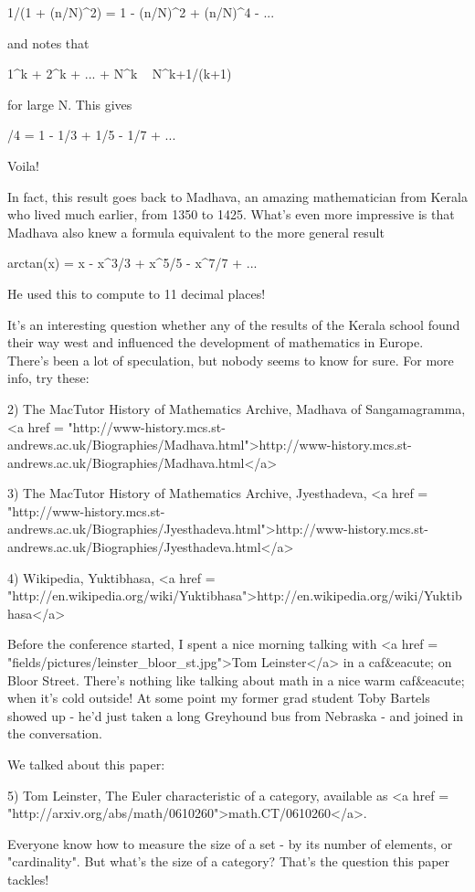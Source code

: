 1/(1 + (n/N)^{2}) = 1 - (n/N)^{2} + (n/N)^{4} - ...

and notes that 

1^{k} + 2^{k} + ... + N^{k} ~ N^{k+1}/(k+1)

for large N.  This gives

\pi /4 = 1 - 1/3 + 1/5 - 1/7 + ...

Voila!

In fact, this result goes back to Madhava, an amazing mathematician 
from Kerala who lived much earlier, from 1350 to 1425.  What's even
more impressive is that Madhava also knew a formula equivalent to the
more general result

arctan(x) = x - x^{3}/3 + x^{5}/5 - x^{7}/7 + ...

He used this to compute \pi  to 11 decimal places!   

It's an interesting question whether any of the results of the
Kerala school found their way west and influenced the development
of mathematics in Europe.  There's been a lot of speculation, but
nobody seems to know for sure.  For more info, try these:

2) The MacTutor History of Mathematics Archive, Madhava of 
Sangamagramma, 
<a href = "http://www-history.mcs.st-andrews.ac.uk/Biographies/Madhava.html">http://www-history.mcs.st-andrews.ac.uk/Biographies/Madhava.html</a>

3) The MacTutor History of Mathematics Archive, Jyesthadeva,
<a href = "http://www-history.mcs.st-andrews.ac.uk/Biographies/Jyesthadeva.html">http://www-history.mcs.st-andrews.ac.uk/Biographies/Jyesthadeva.html</a>

4) Wikipedia, Yuktibhasa, 
<a href = "http://en.wikipedia.org/wiki/Yuktibhasa">http://en.wikipedia.org/wiki/Yuktibhasa</a>

Before the conference started, I spent a nice morning talking with
<a href = "fields/pictures/leinster_bloor_st.jpg">Tom Leinster</a> 
in a caf&eacute; on Bloor Street.  There's nothing like talking
about math in a nice warm caf&eacute; when it's cold outside!  At some 
point my former grad student Toby Bartels showed up - he'd just taken a
long Greyhound bus from Nebraska - and joined in the conversation.  

We talked about this paper:

5) Tom Leinster, The Euler characteristic of a category, available as
<a href =
"http://arxiv.org/abs/math/0610260">math.CT/0610260</a>.

Everyone know how to measure the size of a set - by its number of
elements, or "cardinality".  But what's the size of a
category?  That's the question this paper tackles!

